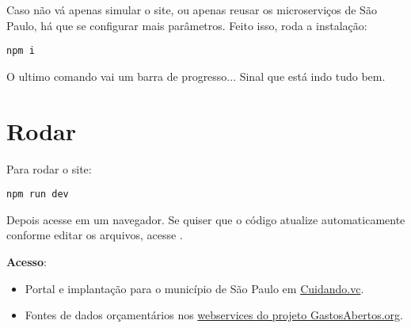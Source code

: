 \documentclass[letterpaper,10pt,portuges]{sphinxmanual}
\begin{document}
Caso não vá apenas simular o site, ou apenas reusar os microserviços de
São Paulo, há que se configurar mais parâmetros. Feito isso, roda a
instalação:

\begin{Verbatim}[commandchars=\\\{\}]
npm i
\end{Verbatim}

O ultimo comando vai um barra de progresso... Sinal que está indo tudo
bem.


\chapter{Rodar}
\label{install-site:rodar}
Para rodar o site:

\begin{Verbatim}[commandchars=\\\{\}]
npm run dev
\end{Verbatim}

Depois acesse  em um navegador. Se quiser que o código
atualize automaticamente conforme editar os arquivos, acesse
.

\textbf{Acesso}:
\begin{itemize}
\item {} 
Portal e implantação para o município de São Paulo em  \href{http://cuidando.vc}{Cuidando.vc}.

\item {} 
Fontes de dados orçamentários nos \href{http://demo.gastosabertos.org}{webservices do projeto GastosAbertos.org}.

\end{itemize}
\end{document}
